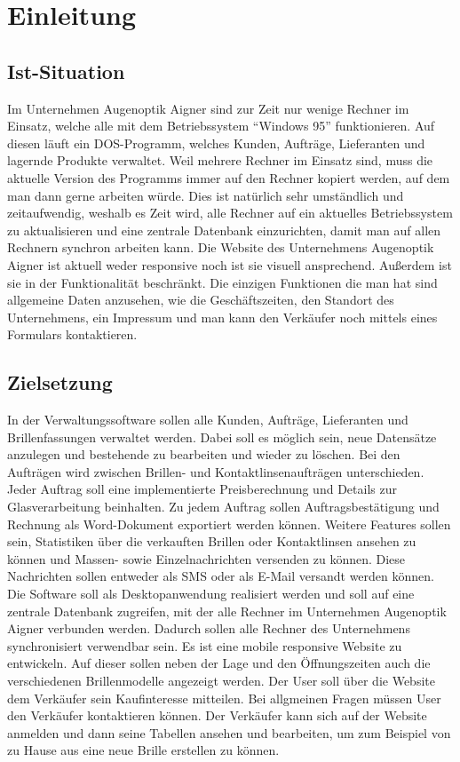 \chapter{Einleitung}
\section{Ist-Situation}
Im Unternehmen Augenoptik Aigner sind zur Zeit nur wenige Rechner im Einsatz, welche alle mit dem Betriebssystem “Windows 95” funktionieren. Auf diesen läuft ein DOS-Programm, welches Kunden,  Aufträge, Lieferanten und lagernde Produkte  verwaltet. Weil mehrere Rechner im Einsatz sind, muss die aktuelle Version des Programms immer auf den Rechner kopiert werden, auf dem man dann gerne arbeiten würde. Dies ist natürlich sehr umständlich und zeitaufwendig, weshalb es Zeit wird, alle Rechner auf ein aktuelles Betriebssystem zu aktualisieren und eine zentrale Datenbank einzurichten, damit man auf allen Rechnern synchron arbeiten kann.\newline
Die Website des Unternehmens Augenoptik Aigner ist aktuell weder responsive noch ist sie visuell ansprechend. Außerdem ist sie in der Funktionalität beschränkt. Die einzigen Funktionen die man hat sind allgemeine Daten anzusehen, wie die Geschäftszeiten, den Standort des Unternehmens, ein Impressum und man kann den Verkäufer noch mittels eines Formulars kontaktieren. 

\section{Zielsetzung}
In der Verwaltungssoftware sollen alle Kunden, Aufträge, Lieferanten und Brillenfassungen verwaltet werden. Dabei soll es möglich sein, neue Datensätze anzulegen und bestehende zu bearbeiten und wieder zu löschen. Bei den Aufträgen wird zwischen Brillen- und Kontaktlinsenaufträgen unterschieden. Jeder Auftrag soll eine implementierte Preisberechnung und Details zur Glasverarbeitung beinhalten. Zu jedem Auftrag sollen Auftragsbestätigung und Rechnung als Word-Dokument exportiert werden können. \newline Weitere Features sollen sein, Statistiken über die verkauften Brillen oder Kontaktlinsen ansehen zu können und Massen- sowie Einzelnachrichten versenden zu können. Diese Nachrichten sollen entweder als SMS oder als E-Mail versandt werden können. \newline Die Software soll als Desktopanwendung realisiert werden und soll auf eine zentrale Datenbank zugreifen, mit der alle Rechner im Unternehmen Augenoptik Aigner verbunden werden. Dadurch sollen alle Rechner des Unternehmens synchronisiert verwendbar sein.
Es ist eine mobile responsive Website zu entwickeln. Auf dieser sollen neben der Lage und den Öffnungszeiten auch die verschiedenen Brillenmodelle angezeigt werden. Der User soll über die Website dem Verkäufer sein Kaufinteresse mitteilen. Bei allgmeinen Fragen müssen User den Verkäufer kontaktieren können. Der Verkäufer kann sich auf der Website anmelden und dann seine Tabellen ansehen und bearbeiten, um zum Beispiel von zu Hause aus eine neue Brille erstellen zu können. 


